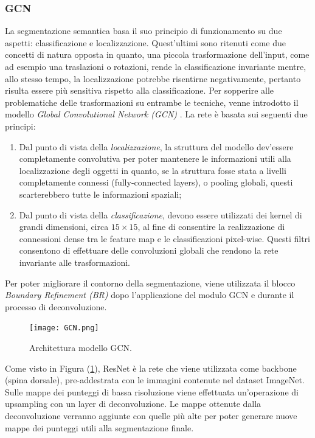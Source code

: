\subsubsection{GCN}
La segmentazione semantica basa il suo principio di funzionamento su due aspetti: 
classificazione e localizzazione. Quest'ultimi sono ritenuti come due concetti 
di natura opposta in quanto, una piccola trasformazione dell'input, come ad 
esempio una traslazioni o rotazioni, rende la classificazione invariante mentre, allo 
stesso tempo, la localizzazione potrebbe risentirne negativamente, pertanto risulta 
essere più sensitiva rispetto alla classificazione. Per sopperire alle problematiche 
delle trasformazioni su entrambe le tecniche, venne introdotto il modello \emph{Global 
Convolutional Network (GCN)} \cite{gcn}. La rete è basata sui seguenti due principi:
\begin{enumerate}
    \item Dal punto di vista della \emph{localizzazione}, la struttura del modello dev'essere 
    completamente convolutiva per poter mantenere le informazioni utili alla 
    localizzazione degli oggetti in quanto, se la struttura fosse stata a livelli 
    completamente connessi (fully-connected layers), o pooling globali, questi 
    scarterebbero tutte le informazioni spaziali;
    \item Dal punto di vista della \emph{classificazione}, devono essere utilizzati dei kernel 
    di grandi dimensioni, circa $15\times 15$, al fine di consentire la realizzazione di 
    connessioni dense tra le feature map e le classificazioni pixel-wise. Questi 
    filtri consentono di effettuare delle convoluzioni globali che rendono la rete 
    invariante alle trasformazioni.
\end{enumerate}
Per poter migliorare il contorno della segmentazione, viene utilizzata il blocco 
\emph{Boundary Refinement (BR)} dopo l'applicazione del modulo GCN e durante 
il processo di deconvoluzione.
\begin{figure}
    \centering
    \texttt{[image: GCN.png]}
    \centering
    \caption{Architettura modello GCN.}
    \label{gcn}
\end{figure}
Come visto in Figura (\ref{gcn}), ResNet è la rete che viene utilizzata come 
backbone (spina dorsale), pre-addestrata con le immagini contenute nel dataset 
ImageNet. Sulle mappe dei punteggi di bassa risoluzione viene effettuata un'operazione 
di upsampling con un layer di deconvoluzione. Le mappe ottenute dalla 
deconvoluzione verranno aggiunte con quelle più alte per poter generare nuove 
mappe dei punteggi utili alla segmentazione finale.

